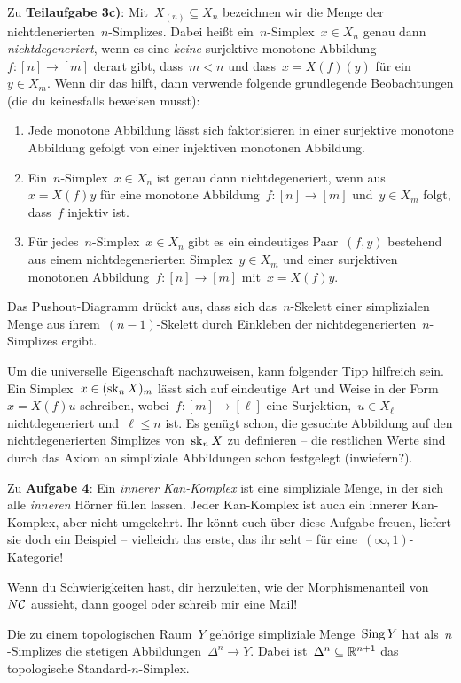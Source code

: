 \documentclass{uebblatt}
\begin{document}
Zu \textbf{Teilaufgabe 3c)}: Mit~$X_{(n)} \subseteq X_n$ bezeichnen wir die
Menge der nichtdenerierten~$n$-Simplizes. Dabei heißt ein~$n$-Simplex~$x
\in X_n$ genau dann \emph{nichtdegeneriert}, wenn es eine \emph{keine} surjektive monotone
Abbildung~$f : [n] \to [m]$ derart gibt, dass~$m < n$ und dass~$x = X(f)(y)$ für ein~$y
\in X_m$. Wenn dir das hilft, dann verwende folgende grundlegende Beobachtungen
(die du keinesfalls beweisen musst):
\begin{enumerate}
\item Jede monotone Abbildung lässt sich faktorisieren in einer surjektive
monotone Abbildung gefolgt von einer injektiven monotonen Abbildung.
\item Ein~$n$-Simplex~$x \in X_n$ ist genau dann nichtdegeneriert, wenn aus~$x
= X(f)y$ für eine monotone Abbildung~$f : [n] \to [m]$ und~$y \in X_m$ folgt,
dass~$f$ injektiv ist.
\item Für jedes~$n$-Simplex~$x \in X_n$ gibt es ein eindeutiges Paar~$(f,y)$
bestehend aus einem nichtdegenerierten Simplex~$y \in X_m$ und einer
surjektiven monotonen Abbildung~$f : [n] \to [m]$ mit~$x = X(f)y$.
\end{enumerate}

Das Pushout-Diagramm drückt aus, dass sich das~$n$-Skelett einer simplizialen
Menge aus ihrem~$(n-1)$-Skelett durch Einkleben der
nichtdegenerierten~$n$-Simplizes ergibt.

Um die universelle Eigenschaft nachzuweisen, kann folgender Tipp hilfreich
sein. Ein Simplex~$x \in (\operatorname{sk}_n X)_m$ lässt sich auf eindeutige Art und
Weise in der Form~$x = X(f)u$ schreiben, wobei~$f : [m] \to [\ell]$ eine
Surjektion,~$u \in X_\ell$ nichtdegeneriert und~$\ell \leq n$ ist. Es genügt
schon, die gesuchte Abbildung auf den nichtdegenerierten Simplizes von~$\operatorname{sk}_n
X$ zu definieren -- die restlichen Werte sind durch das Axiom an simpliziale
Abbildungen schon festgelegt (inwiefern?).

Zu \textbf{Aufgabe 4}: Ein \emph{innerer Kan-Komplex} ist eine simpliziale
Menge, in der sich alle \emph{inneren} Hörner füllen lassen. Jeder Kan-Komplex
ist auch ein innerer Kan-Komplex, aber nicht umgekehrt. Ihr könnt euch über
diese Aufgabe freuen, liefert sie doch ein Beispiel -- vielleicht das erste,
das ihr seht -- für eine~$(\infty,1)$-Kategorie!

Wenn du Schwierigkeiten hast, dir herzuleiten, wie der Morphismenanteil
von~$N\mathcal{C}$ aussieht, dann googel oder schreib mir eine Mail!

Die zu einem topologischen Raum~$Y$ gehörige simpliziale Menge~$\operatorname{Sing} Y$ hat
als~$n$-Simplizes die stetigen Abbildungen~$\Delta^n \to Y$. Dabei
ist~$\Delta^n \subseteq \mathbb{R}^{n+1}$ das topologische Standard-$n$-Simplex.
\end{document}
